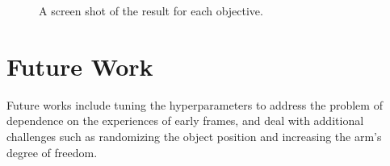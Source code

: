 \documentclass[a4paper]{article}
\begin{document}
\begin{figure}[htp]
  \centering
  \vfill
  \caption{A screen shot of the result for each objective.}
  \label{fig:result}
\end{figure}

\clearpage
\section{Future Work}
Future works include tuning the hyperparameters to address the problem of dependence on the experiences of early frames, and deal with additional challenges such as randomizing the object position and increasing the arm's degree of freedom.



\end{document}
